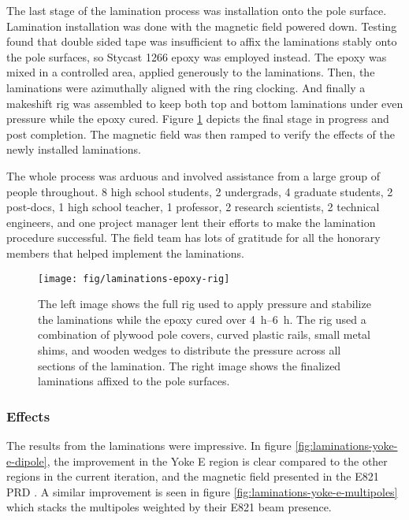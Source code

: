 The last stage of the lamination process was installation onto the pole surface.  Lamination installation was done with the magnetic field powered down.  Testing found that double sided tape was insufficient to affix the laminations stably onto the pole surfaces, so Stycast 1266 epoxy was employed instead.  The epoxy was mixed in a controlled area, applied generously to the laminations. Then, the laminations were azimuthally aligned with the ring clocking.  And finally a makeshift rig was assembled to keep both top and bottom laminations under even pressure while the epoxy cured.  Figure \ref{fig:laminations-epoxy-rig} depicts the final stage in progress and post completion.  The magnetic field was then ramped to verify the effects of the newly installed laminations.

The whole process was arduous and involved assistance from a large group of people throughout.  8 high school students, 2 undergrads, 4 graduate students, 2 post-docs, 1 high school teacher, 1 professor, 2 research scientists, 2 technical engineers, and one project manager lent their efforts to make the lamination procedure successful.  The field team has lots of gratitude for all the honorary members that helped implement the laminations.

\begin{figure}
\centering
\texttt{[image: fig/laminations-epoxy-rig]}
\caption{
    The left image shows the full rig used to apply pressure and stabilize the laminations while the epoxy cured over \SIrange{4}{6}{\hour}.  The rig used a combination of plywood pole covers, curved plastic rails, small metal shims, and wooden wedges to distribute the pressure across all sections of the lamination.  The right image shows the finalized laminations affixed to the pole surfaces.
    \label{fig:laminations-epoxy-rig}
}
\end{figure}

\subsubsection{Effects}

The results from the laminations were impressive.  In figure \ref{fig:laminations-yoke-e-dipole}, the improvement in the Yoke E region is clear compared to the other regions in the current iteration, and the magnetic field presented in the E821 PRD \cite{e821-prd}.  A similar improvement is seen in figure \ref{fig:laminations-yoke-e-multipoles} which stacks the multipoles weighted by their E821 beam presence.

